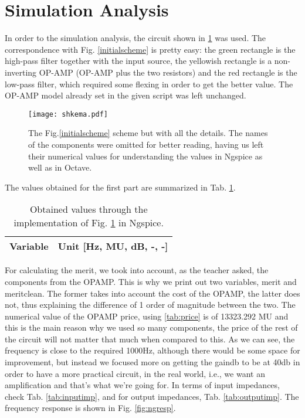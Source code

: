 \section{Simulation Analysis}

In order to the simulation analysis, the circuit shown in \ref{fig:schemescheme} was used. The correspondence with Fig. \ref{initialscheme} is pretty easy: the green rectangle is the high-pass filter together with the input source, the yellowish rectangle is a non-inverting OP-AMP (OP-AMP plus the two resistors) and the red rectangle is the low-pass filter, which required some flexing in order to get the better value. The OP-AMP model already set in the given script was left unchanged.

\begin{figure}[H]
    \centering
    \texttt{[image: shkema.pdf]}
    \caption{The Fig.\ref{initialscheme} scheme but with all the details. The names of the components were omitted for better reading, having us left their numerical values for understanding the values in Ngspice as well as in Octave.}
    \label{fig:schemescheme}
\end{figure}

The values obtained for the first part are summarized in Tab. \ref{tab:valuesng}.

\begin{table}[H]
    \centering 
    \begin{tabular}{|c|c|}
    	\hline
    	Variable & Unit [Hz, MU, dB, -, -]\\ 
    	\hline
         
    \end{tabular}
    \caption{Obtained values through the implementation of Fig. \ref{fig:schemescheme} in Ngspice.}
    \label{tab:valuesng}
\end{table}

For calculating the merit, we took into account, as the teacher asked, the components from the OPAMP. This is why we print out two variables, merit and meritclean. The former takes into account the cost of the OPAMP, the latter does not, thus explaining the difference of 1 order of magnitude between the two. The numerical value of the OPAMP price, using \ref{tab:price} is of 13323.292 MU and this is the main reason why we used so many components, the price of the rest of the circuit will not matter that much when compared to this. As we can see, the frequency is close to the required 1000Hz, although there would be some space for improvement, but instead we focused more on getting the gaindb to be at 40db in order to have a more practical circuit, in the real world, i.e., we want an amplification and that's what we're going for. In terms of input impedances, check Tab. \ref{tab:inputimp}, and for output impedances, Tab. \ref{tab:outputimp}. The frequency response is shown in Fig. \ref{fig:ngresp}.

